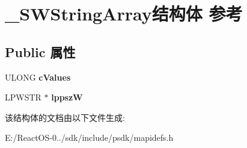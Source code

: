 \hypertarget{struct___s_w_string_array}{}\section{\+\_\+\+S\+W\+String\+Array结构体 参考}
\label{struct___s_w_string_array}
\subsection*{Public 属性}
\begin{DoxyCompactItemize}
\item 
\mbox{\label{struct___s_w_string_array_a77e0af342a24a5bdb566a38179144ca2}} 
U\+L\+O\+NG {\bfseries c\+Values}
\item 
\mbox{\label{struct___s_w_string_array_a4d5ea4b1676cd37e1191af35462d6e6f}} 
L\+P\+W\+S\+TR $\ast$ {\bfseries lppszW}
\end{DoxyCompactItemize}


该结构体的文档由以下文件生成\+:\begin{DoxyCompactItemize}
\item 
E\+:/\+React\+O\+S-\/0../sdk/include/psdk/mapidefs.\+h\end{DoxyCompactItemize}
